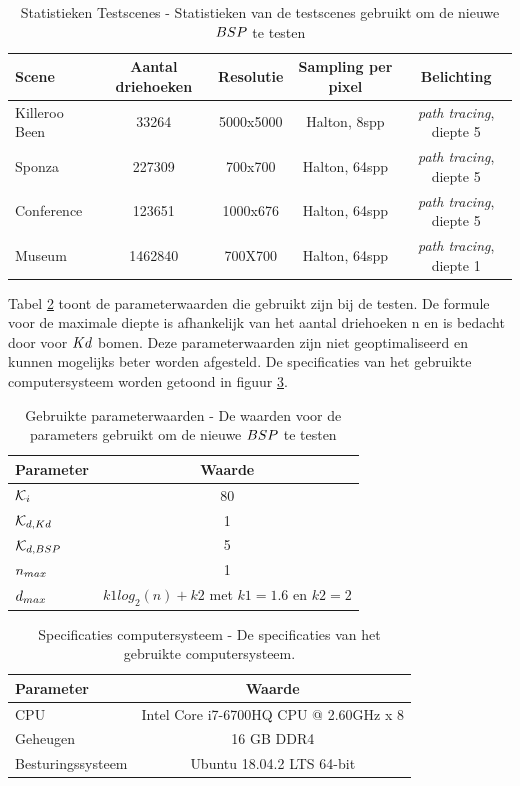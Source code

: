 \begin{table}
  \centering
  \begin{tabular}{@{}lcccc@{}} \toprule
  Scene & Aantal driehoeken & Resolutie & Sampling per pixel & Belichting\\ \midrule
  Killeroo Been & 33264 & 5000x5000 & Halton, 8spp & \textit{path tracing}, diepte 5\\
  Sponza & 227309 & 700x700 & Halton, 64spp & \textit{path tracing}, diepte 5\\
  Conference & 123651 & 1000x676 & Halton, 64spp & \textit{path tracing}, diepte 5\\
  Museum & 1462840 & 700X700 & Halton, 64spp & \textit{path tracing}, diepte 1\\ \bottomrule
 \end{tabular}
  \caption[Statistieken Testscenes]{Statistieken Testscenes - \small Statistieken van de testscenes gebruikt om de nieuwe $BSP$ te testen}
  \label{tab:results-statistics-scenes}
\end{table}

Tabel \ref{tab:results-parameters} toont de parameterwaarden die gebruikt zijn bij de testen. De formule voor de maximale diepte is afhankelijk van het aantal driehoeken n en is bedacht door \authorHavranBittner{} \cite{havran2002improving} voor $Kd$ bomen. Deze parameterwaarden zijn niet geoptimaliseerd en kunnen mogelijks beter worden afgesteld.
De specificaties van het gebruikte computersysteem worden getoond in figuur \ref{tab:results-specs}.
\begin{table}
  \centering
  \begin{tabular}{@{}lc@{}} \toprule
  Parameter & Waarde \\ \midrule
  $\mathcal{K}_i$ & 80 \\
  $\mathcal{K}_{d,Kd}$ & 1 \\
  $\mathcal{K}_{d,BSP}$ & 5 \\
  $n_{max}$ & 1 \\
  $d_{max}$ & $k1log_2(n) + k2$ met $k1 = 1.6$ en $k2 = 2$ \\
  \bottomrule
 \end{tabular}
  \caption[Gebruikte parameterwaarden]{Gebruikte parameterwaarden - \small De waarden voor de parameters gebruikt om de nieuwe $BSP$ te testen}
  \label{tab:results-parameters}
\end{table}

\begin{table}
  \centering
  \begin{tabular}{@{}lc@{}} \toprule
  Parameter & Waarde \\ \midrule
  CPU & Intel Core i7-6700HQ CPU @ 2.60GHz x 8 \\
  Geheugen & 16 GB DDR4 \\
  Besturingssysteem & Ubuntu 18.04.2 LTS 64-bit \\
  \bottomrule
 \end{tabular}
  \caption[Specificaties computersysteem]{Specificaties computersysteem - \small De specificaties van het gebruikte computersysteem.}
  \label{tab:results-specs}
\end{table}

